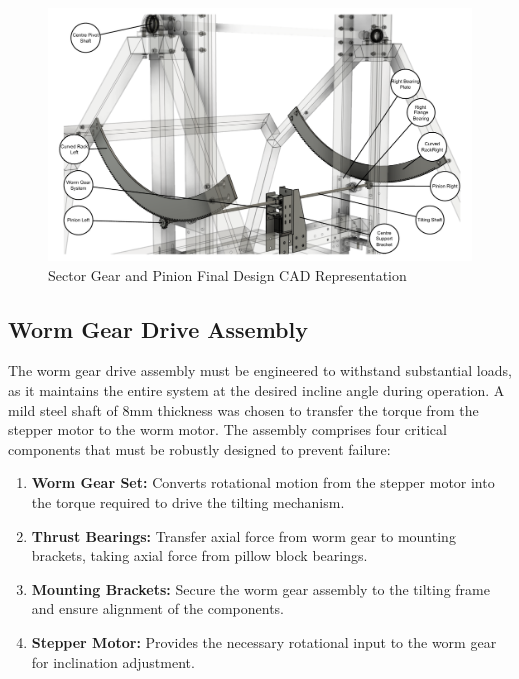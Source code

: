 \begin{figure}[H]
    \centering
    \includegraphics[width=1\linewidth]{figs/final_design/Incline_subsystem_CAD-1.pdf}
    \caption{Sector Gear and Pinion Final Design CAD Representation}
    \label{fig:sector-gear-pinion-cad}
\end{figure}

\subsection{Worm Gear Drive Assembly}

The worm gear drive assembly must be engineered to withstand substantial loads, as it maintains the entire system at the desired incline angle during operation. A mild steel shaft of 8mm thickness was chosen to transfer the torque from the stepper motor to the worm motor. The assembly comprises four critical components that must be robustly designed to prevent failure:

\begin{enumerate}
    \item \textbf{Worm Gear Set:} Converts rotational motion from the stepper motor into the torque required to drive the tilting mechanism.
    \item \textbf{Thrust Bearings:} Transfer axial force from worm gear to mounting brackets, taking axial force from pillow block bearings.
    \item \textbf{Mounting Brackets:} Secure the worm gear assembly to the tilting frame and ensure alignment of the components.
    \item \textbf{Stepper Motor:} Provides the necessary rotational input to the worm gear for inclination adjustment.
\end{enumerate}

